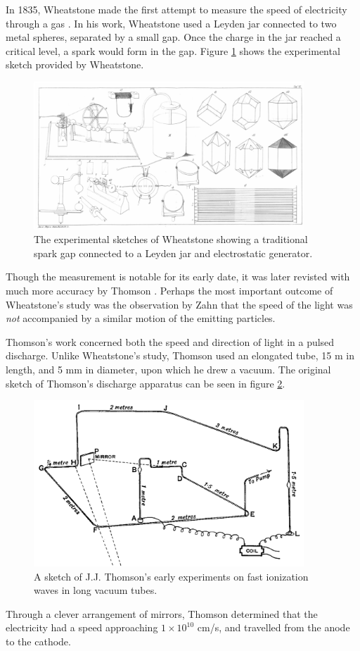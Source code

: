 In 1835, Wheatstone made the first attempt to measure the speed of electricity
through a gas \cite{Wheatstone1835}. In his work, Wheatstone used a Leyden jar
connected to two metal spheres, separated by a small gap. Once the charge in the
jar reached a critical level, a spark would form in the gap. Figure
\ref{fig:wheatstone} shows the experimental sketch provided by Wheatstone.
\begin{figure}
  \centering
  \includegraphics[width=4in]{chapters/introduction/figures/wheatstone.png}
  \caption{The experimental sketches of Wheatstone showing a traditional
  spark gap connected to a Leyden jar and electrostatic
generator.}\label{fig:wheatstone}
\end{figure}
Though the measurement is notable for its early date, it was later revisted with
much more accuracy by Thomson \cite{Thomson1893}. Perhaps the most important
outcome of Wheatstone's study was the observation by Zahn \cite{Zahn1879} that
the speed of the light was \emph{not} accompanied by a similar motion of the
emitting particles.

Thomson's work concerned both the speed and direction of light in a pulsed
discharge. Unlike Wheatstone's study, Thomson used an elongated tube, 15 m in
length, and 5 mm in diameter, upon which he drew a vacuum. The original sketch
of Thomson's discharge apparatus can be seen in figure \ref{fig:thomson}.
\begin{figure}
  \centering
  \includegraphics[width=4in]{chapters/introduction/figures/thomson.png}
  \caption{A sketch of J.J. Thomson's early experiments on fast ionization
  waves in long vacuum tubes.}\label{fig:thomson}
\end{figure}
Through a clever arrangement of mirrors, Thomson determined that the electricity
had a speed approaching $1\times10^{10}$ cm/s, and travelled from the anode to
the cathode.

